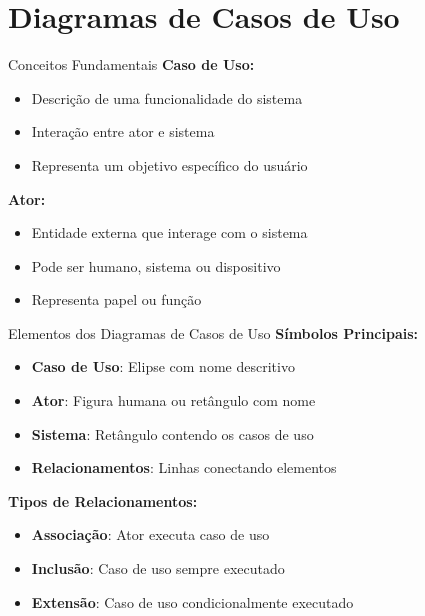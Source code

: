 \documentclass[aspectratio=169]{beamer}
\begin{document}
\section{Diagramas de Casos de Uso}

\begin{frame}{Conceitos Fundamentais}
\textbf{Caso de Uso:}
\begin{itemize}
\item Descrição de uma funcionalidade do sistema
\item Interação entre ator e sistema
\item Representa um objetivo específico do usuário
\end{itemize}

\vspace{0.5cm}
\textbf{Ator:}
\begin{itemize}
\item Entidade externa que interage com o sistema
\item Pode ser humano, sistema ou dispositivo
\item Representa papel ou função
\end{itemize}
\end{frame}

\begin{frame}{Elementos dos Diagramas de Casos de Uso}
\textbf{Símbolos Principais:}
\begin{itemize}
\item \textbf{Caso de Uso}: Elipse com nome descritivo
\item \textbf{Ator}: Figura humana ou retângulo com nome
\item \textbf{Sistema}: Retângulo contendo os casos de uso
\item \textbf{Relacionamentos}: Linhas conectando elementos
\end{itemize}

\vspace{0.5cm}
\textbf{Tipos de Relacionamentos:}
\begin{itemize}
\item \textbf{Associação}: Ator executa caso de uso
\item \textbf{Inclusão}: Caso de uso sempre executado
\item \textbf{Extensão}: Caso de uso condicionalmente executado
\end{itemize}
\end{frame}
\end{document}
